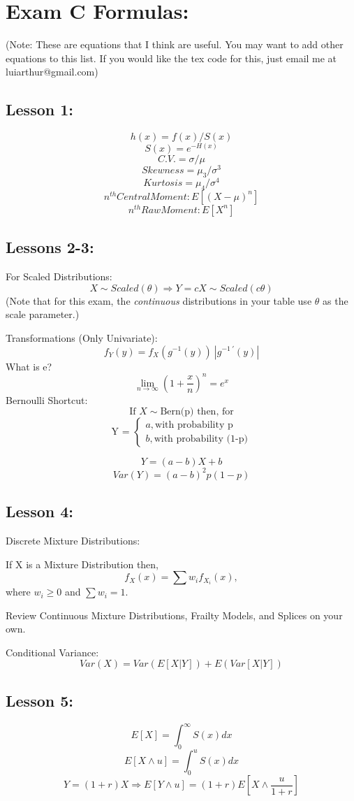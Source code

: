 \documentclass[11pt,twocolumn]{article}
\def\wl{\par \vspace{\baselineskip}}
\def\imply{\Rightarrow}
\begin{document}
\section*{Exam C Formulas:}
(Note: These are equations that I think are
       useful. You may want to add other equations
       to this list. If you would like the tex code
       for this, just email me at luiarthur@gmail.com)
\subsection*{Lesson 1:}
  \[ h(x) = f(x) / S(x)         \]
  \[ S(x) = e^{-H(x)}           \]
  \[C.V.  = \sigma / \mu        \]
  \[Skewness = \mu_3 / \sigma^3 \]
  \[Kurtosis = \mu_4 / \sigma^4 \]
  \[n^{th} Central Moment: E[(X-\mu)^n] \]
  \[n^{th} Raw Moment:     E[X^n]       \]

\subsection*{Lessons 2-3:}
  For Scaled Distributions: \\
  \[ X \sim Scaled(\theta) \imply Y = cX \sim Scaled(c\theta) \]
  (Note that for this exam, the \textit{continuous} distributions
  in your table use $\theta$ as the scale parameter.)
  \wl\noindent
  Transformations (Only Univariate):
  \[ f_Y(y) = f_X(g^{-1}(y))~|g^{-1~\prime}(y)|\]
  What is e?
  \[ \lim_{n \to \infty} \left( 1+\frac{x}{n}\right)^n = e^x\]
  Bernoulli Shortcut: 
  \[\text{If } X\sim \text{Bern(p) then, for} \]
  \[\text{Y = }\begin{cases} a, \text{with~probability~p} \\
                             b, \text{with~probability~(1-p)}
               \end{cases}\]
  \wl
  \[ Y = (a-b)X + b \]
  \[ Var(Y) = (a-b)^2 p(1-p) \]

\subsection*{Lesson 4:}
  Discrete Mixture Distributions:
  \wl\noindent
  If X is a Mixture Distribution then,
  \[
    f_X(x) = \sum{w_i f_{X_i}(x)}, 
  \]
  where $w_i \ge 0$ and $\sum{w_i} = 1$.
  \wl\noindent
  Review Continuous Mixture Distributions, Frailty Models,
  and Splices on your own.
  \wl\noindent
  Conditional Variance:
  \[
    Var(X) = Var(E[X|Y]) + E(Var[X|Y])
  \]

\subsection*{Lesson 5:}
  \[ E[X] = \int_0^\infty{S(x)}dx \]
  \[ E[X \wedge u] = \int_0^u{S(x)}dx \]
  \[ Y = (1+r)X \imply E[Y \wedge u] = (1+r)E[X \wedge \frac{u}{1+r}] \]
\end{document}
